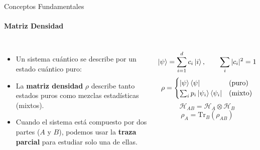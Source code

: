 \documentclass[aspectratio=169,xcolor=dvipsnames]{beamer}
\begin{document}
\begin{frame}{Conceptos Fundamentales}
\framesubtitle{Matriz Densidad}

\begin{columns}
    \begin{itemize}
        \bigskip
        \item Un sistema cuántico se describe por un estado cuántico puro:
        \bigskip
        \bigskip
        \item La \textbf{matriz densidad} $\rho$ describe tanto estados puros como mezclas estadísticas (mixtos).
        \bigskip
        \medskip
        \item Cuando el sistema está compuesto por dos partes ($A$ y $B$), podemos usar la \textbf{traza parcial} para estudiar solo una de ellas.

    \end{itemize}
    $$
    \ket{\psi} = \sum_{i=1}^d c_i \ket{i},
    \qquad 
    \sum_i |c_i|^2 = 1
    $$
    \smallskip
    $$
    \rho =\begin{cases}
        \ket{\psi}\bra{\psi} & \text{(puro)} \\
        \sum_i p_i \ket{\psi_i} \bra{\psi_i} & \text{(mixto)}
    \end{cases}
    $$
    \medskip
    $$
    \mathcal{H}_{AB} = \mathcal{H}_{A} \otimes \mathcal{H}_B
    $$
    $$
    \rho_A = \text{Tr}_B(\rho_{AB})
    $$
\end{columns}
\end{frame}







\end{document}
